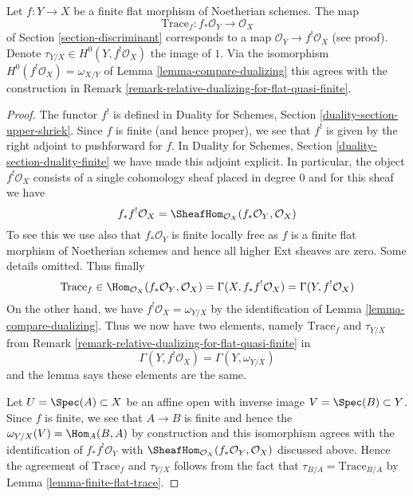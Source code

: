 \begin{lemma}
\label{lemma-compare-trace}
Let $f : Y \to X$ be a finite flat morphism of Noetherian schemes.
The map
$$
\text{Trace}_f : f_*\mathcal{O}_Y \longrightarrow \mathcal{O}_X
$$
of Section \ref{section-discriminant}
corresponds to a map $\mathcal{O}_Y \to f^!\mathcal{O}_X$ (see proof).
Denote $\tau_{Y/X} \in H^0(Y, f^!\mathcal{O}_X)$ the image of $1$.
Via the isomorphism $H^0(f^!\mathcal{O}_X) = \omega_{X/Y}$ of
Lemma \ref{lemma-compare-dualizing}
this agrees with the construction in
Remark \ref{remark-relative-dualizing-for-flat-quasi-finite}.
\end{lemma}

\begin{proof}
The functor $f^!$ is defined in 
Duality for Schemes, Section \ref{duality-section-upper-shriek}.
Since $f$ is finite (and hence proper), we see that $f^!$ is given by
the right adjoint to pushforward for $f$. In
Duality for Schemes, Section \ref{duality-section-duality-finite}
we have made this adjoint explicit. In particular,
the object $f^!\mathcal{O}_X$ consists of a single
cohomology sheaf placed in degree $0$ and for this sheaf we have
$$
f_*f^!\mathcal{O}_X =
\SheafHom_{\mathcal{O}_X}(f_*\mathcal{O}_Y, \mathcal{O}_X)
$$
To see this we use also that $f_*\mathcal{O}_Y$ is finite locally free
as $f$ is a finite flat morphism of Noetherian schemes
and hence all higher Ext sheaves are zero. Some details omitted.
Thus finally
$$
\text{Trace}_f \in
\Hom_{\mathcal{O}_X}(f_*\mathcal{O}_Y, \mathcal{O}_X) =
\Gamma(X, f_*f^!\mathcal{O}_X) =
\Gamma(Y, f^!\mathcal{O}_X)
$$
On the other hand, we have $f^!\mathcal{O}_X = \omega_{Y/X}$
by the identification of Lemma \ref{lemma-compare-dualizing}.
Thus we now have two elements, namely $\text{Trace}_f$
and $\tau_{Y/X}$ from
Remark \ref{remark-relative-dualizing-for-flat-quasi-finite} in
$$
\Gamma(Y, f^!\mathcal{O}_X) = \Gamma(Y, \omega_{Y/X})
$$
and the lemma says these elements are the same.

\medskip\noindent
Let $U = \Spec(A) \subset X$ be an affine open with inverse image
$V = \Spec(B) \subset Y$. Since $f$ is finite, we see that
$A \to B$ is finite and hence the $\omega_{Y/X}(V) = \Hom_A(B,A)$
by construction and this isomorphism agrees with the identification
of $f_*f^!\mathcal{O}_Y$ with
$\SheafHom_{\mathcal{O}_X}(f_*\mathcal{O}_Y, \mathcal{O}_X)$ discussed
above. Hence the agreement of $\text{Trace}_f$ and $\tau_{Y/X}$
follows from the fact that $\tau_{B/A} = \text{Trace}_{B/A}$
by Lemma \ref{lemma-finite-flat-trace}.
\end{proof}








